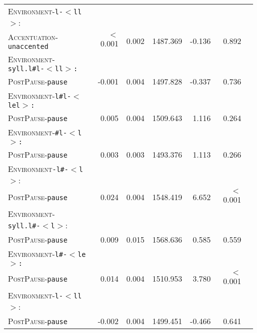 \begin{table}
{\begin{tabular} {lrrrrrr}
		\textsc{Environment}-\texttt{l-$<$ll$>$}:&&&&&\\
		\textsc{Accentuation}-\texttt{unaccented} & \color[HTML]{9B9B9B} $<$0.001 &\color[HTML]{9B9B9B}  0.002 & \color[HTML]{9B9B9B} 1487.369 &\color[HTML]{9B9B9B}  -0.136 & \color[HTML]{9B9B9B} 0.892 \\ 
		
		\textsc{Environment}-\texttt{syll.l\#l-$<$ll$>$:}&&&&&\\
		\textsc{PostPause}-\texttt{pause} &\color[HTML]{9B9B9B}  -0.001 &\color[HTML]{9B9B9B}  0.004 & \color[HTML]{9B9B9B} 1497.828 &\color[HTML]{9B9B9B}  -0.337 & \color[HTML]{9B9B9B} 0.736 \\ 
		
		\textsc{Environment}-\texttt{l\#l-$<$lel$>$:}&&&&&\\
		\textsc{PostPause}-\texttt{pause} &\color[HTML]{9B9B9B}  0.005 &\color[HTML]{9B9B9B}  0.004 &\color[HTML]{9B9B9B} 1509.643 & \color[HTML]{9B9B9B} 1.116 &\color[HTML]{9B9B9B}  0.264 \\ 
		
		\textsc{Environment}-\texttt{\#l-$<$l$>$:}&&&&&\\
		\textsc{PostPause}-\texttt{pause} & \color[HTML]{9B9B9B} 0.003 &\color[HTML]{9B9B9B}  0.003 & \color[HTML]{9B9B9B} 1493.376 &\color[HTML]{9B9B9B}  1.113 & \color[HTML]{9B9B9B} 0.266 \\ 
		
		\textsc{Environment}\texttt{-l\#-$<$l$>$}:&&&&&\\
		\textsc{PostPause}-\texttt{pause} & 0.024 & 0.004 & 1548.419 & 6.652 &  $<$0.001 \\ 
		
		\textsc{Environment}-\texttt{syll.l\#-$<$l$>$}:&&&&&\\
		\textsc{PostPause}-\texttt{pause} &\color[HTML]{9B9B9B}  0.009 &\color[HTML]{9B9B9B}  0.015 & \color[HTML]{9B9B9B} 1568.636 &\color[HTML]{9B9B9B}  0.585 & \color[HTML]{9B9B9B} 0.559 \\ 
		
		\textsc{Environment}-\texttt{l\#-$<$le$>$:}&&&&&\\
		\textsc{PostPause}-\texttt{pause} & 0.014 & 0.004 & 1510.953 & 3.780 &  $<$0.001 \\
		
		\textsc{Environment}-\texttt{l-$<$ll$>$}:&&&&&\\
		\textsc{PostPause}-\texttt{pause} & \color[HTML]{9B9B9B} -0.002 & \color[HTML]{9B9B9B} 0.004 & \color[HTML]{9B9B9B} 1499.451 &\color[HTML]{9B9B9B}  -0.466 & \color[HTML]{9B9B9B} 0.641 \\ 
		\midrule
			\end{tabular}
}


\end{table}


